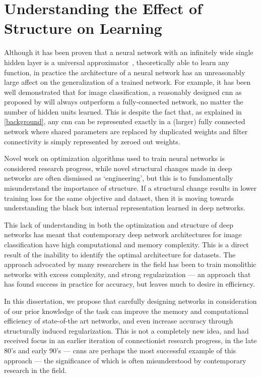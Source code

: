 \documentclass[thesis]{subfiles}
\begin{document}
\section{Understanding the Effect of Structure on Learning}
Although it has been proven that a neural network with an infinitely wide single hidden layer is a universal approximator~\citep{journals/mcss/Cybenko92,hornik89a},  theoretically able to learn any function, in practice the architecture of a neural network has an unreasonably large affect on the generalization of a trained network. For example, it has been well demonstrated that for image classification, a reasonably designed \gls{cnn} as proposed by \citet{Lecun1998} will always outperform a fully-connected network, no matter the number of hidden units learned. This is despite the fact that, as explained in \cref{background}, any \gls{cnn} can be represented exactly in a (larger) fully connected network where shared parameters are replaced by duplicated weights and filter connectivity is simply represented by zeroed out weights.

Novel work on optimization algorithms used to train neural networks is considered research progress, while novel structural changes made in deep networks are often dismissed as `engineering', but this is to fundamentally misunderstand the importance of structure. If a structural change results in lower training loss for the same objective and dataset, then it is moving towards understanding the black box internal representation learned in deep networks. %

This lack of understanding in both the optimization and structure of deep networks has meant that contemporary deep network architectures for image classification have high computational and memory complexity. This is a direct result of the inability to identify the optimal architecture for datasets. The approach advocated by many researchers in the field has been to train monolithic networks with excess complexity, and strong regularization --- an approach that has found success in practice for accuracy, but leaves much to desire in efficiency.

In this dissertation, we propose that carefully designing networks in consideration of our prior knowledge of the task can improve the memory and computational efficiency of state-of-the art networks, and even increase accuracy through structurally induced regularization. This is not a completely new idea, and had received focus in an earlier iteration of connectionist research progress, in the late 80's and early 90's --- \glspl{cnn} are perhaps the most successful example of this approach --- the significance of which is often misunderstood by contemporary research in the field.
\end{document}
